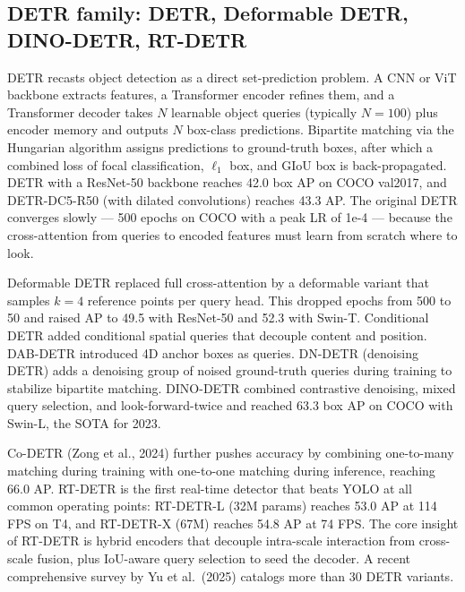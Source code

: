 \documentclass{article}
\begin{document}
\subsection{DETR family: DETR, Deformable DETR, DINO-DETR, RT-DETR}\label{detr-family-detr-deformable-detr-dino-detr-rt-detr}

DETR \citep{carion2020endtoendobjectdete} recasts object detection as a direct set-prediction problem. A CNN or ViT backbone extracts features, a Transformer encoder refines them, and a Transformer decoder takes \(N\) learnable object queries (typically \(N=100\)) plus encoder memory and outputs \(N\) box-class predictions. Bipartite matching via the Hungarian algorithm assigns predictions to ground-truth boxes, after which a combined loss of focal classification, \(\ell_1\) box, and GIoU box is back-propagated. DETR with a ResNet-50 backbone reaches 42.0 box AP on COCO val2017, and DETR-DC5-R50 (with dilated convolutions) reaches 43.3 AP. The original DETR converges slowly --- 500 epochs on COCO with a peak LR of 1e-4 --- because the cross-attention from queries to encoded features must learn from scratch where to look.

Deformable DETR \citep{zhu2021deformabledetrdefo} replaced full cross-attention by a deformable variant that samples \(k=4\) reference points per query head. This dropped epochs from 500 to 50 and raised AP to 49.5 with ResNet-50 and 52.3 with Swin-T. Conditional DETR added conditional spatial queries that decouple content and position. DAB-DETR introduced 4D anchor boxes as queries. DN-DETR (denoising DETR) adds a denoising group of noised ground-truth queries during training to stabilize bipartite matching. DINO-DETR \citep{zhang2023vitaev2visiontrans} combined contrastive denoising, mixed query selection, and look-forward-twice and reached 63.3 box AP on COCO with Swin-L, the SOTA for 2023.

Co-DETR (Zong et al., 2024) further pushes accuracy by combining one-to-many matching during training with one-to-one matching during inference, reaching 66.0 AP. RT-DETR \citep{zhao2024detrsbeatyolosonre} is the first real-time detector that beats YOLO at all common operating points: RT-DETR-L (32M params) reaches 53.0 AP at 114 FPS on T4, and RT-DETR-X (67M) reaches 54.8 AP at 74 FPS. The core insight of RT-DETR is hybrid encoders that decouple intra-scale interaction from cross-scale fusion, plus IoU-aware query selection to seed the decoder. A recent comprehensive survey by Yu et al.~(2025) catalogs more than 30 DETR variants.
\end{document}
